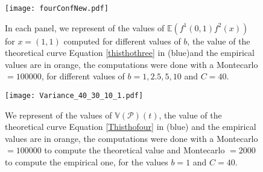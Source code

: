 \documentclass[12pt]{article}
\theoremstyle{Theorem}
\theoremstyle{definition}
\begin{document}
\begin{figure}[H]
  \centering
    {\texttt{[image: fourConfNew.pdf]}}
    \hspace{0.2cm}
 \caption{In each panel, we represent of the values of $\mathbb{E}\left(f^{1}(0,1)f^{2}(x)\right)$ for $x = (1, 1)$ computed for different values of $b$, the value of the theoretical curve Equation \eqref{thisthothree} in (blue)and the empirical values are in orange, the computations were done with a Montecarlo $= 100000$, for different values of $b = 1, 2.5, 5, 10$ and $C = 40$. }
\label{fig2}
\end{figure}

\begin{figure}[H]
  \centering
    {\texttt{[image: Variance\_40\_30\_10\_1.pdf]}}
    \hspace{0.2cm}
 \caption{We represent of the values of $\mathbb{V}\left(\mathcal{P}\right)(t)$, the value of the theoretical curve Equation \eqref{Thisthofour} in (blue) and the empirical values are in orange, the computations were done with a Montecarlo $= 100000$ to compute the theoretical value and Montecarlo $= 2000$ to compute the empirical one, for the values $b = 1$ and $C = 40$. }
\label{fig2}
\end{figure}
\appendix 
\end{document}
